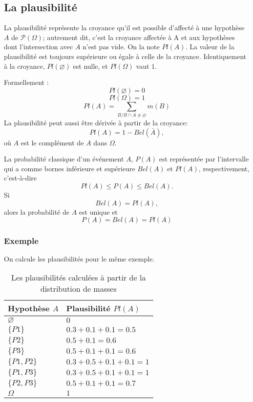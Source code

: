 \subsection{La plausibilité}

La plausibilité représente la croyance qu’il est possible
d’affecté à une hypothèse $A$ de $\mathcal{P}(\Omega)$; autrement dit,
c’est la croyance affectée à A et aux hypothèses dont l'intersection
avec $A$ n’est pas vide. On la note $Pl(A)$. La valeur de la plausibilité est
toujours supérieure ou égale à celle de la croyance. Identiquement à la
croyance, $Pl(\varnothing)$ est nulle, et $Pl(\Omega)$ vaut $1$.

Formellement :
\begin{equation}
Pl(\varnothing) = 0
\end{equation}
\begin{equation}
Pl(\Omega) = 1
\end{equation}
\begin{equation}
Pl(A) = \sum_{B \slash B \cap A \neq \varnothing} m(B)
\end{equation}
La plausibilité peut aussi être dérivée à partir de la croyance:
\begin{equation}
Pl(A) = 1 - Bel(\bar{A}),
\end{equation}
où $A$ est le complément de $A$ dans $\Omega$.

La probabilité classique d’un événement $A$, $P(A)$ est représentée par
l’intervalle qui a comme bornes inférieure et supérieure $Bel(A)$ et $Pl(A)$,
respectivement, c’est-à-dire $$Pl(A) \leq P(A) \leq Bel(A).$$
Si $$Bel(A) = Pl(A),$$ alors la probabilité de $A$ est unique et $$P(A) = Bel(A) = Pl(A)$$

\subsubsection{Exemple}
On calcule les plausibilités pour le même exemple.

\begin{table}[H]
\centering
\begin{tabular}{|l|l|}
\hline
Hypothèse $A$ & Plausibilité $Pl(A)$\\
\hline
$\varnothing$ & $0$ \\
\hline
$\{P1\}$ & $0.3 + 0.1 + 0.1 = 0.5$ \\
\hline
$\{P2\}$ & $0.5 + 0.1 = 0.6$ \\
\hline
$\{P3\}$ & $0.5 + 0.1 + 0.1 = 0.6$ \\
\hline
$\{P1, P2\}$ & $0.3 + 0.5 + 0.1 + 0.1 = 1$ \\
\hline
$\{P1, P3\}$ & $0.3 + 0.5 + 0.1 + 0.1 = 1$ \\
\hline
$\{P2, P3\}$ & $0.5 + 0.1 + 0.1 = 0.7$ \\
\hline
$\Omega$ & $1$ \\
\hline
\end{tabular}
\caption{Les plausibilités calculées à partir de la distribution de masses}
\end{table}
